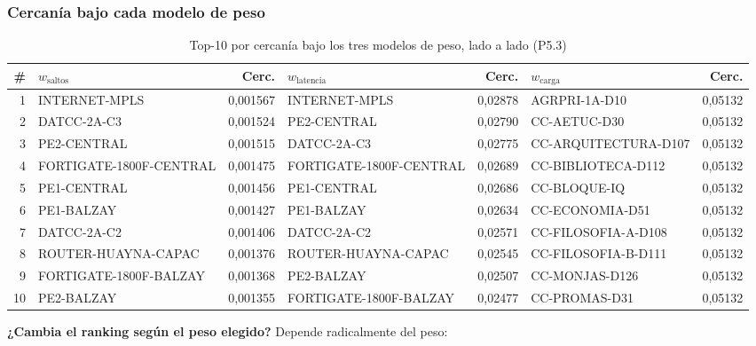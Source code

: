 \documentclass[10pt,a4paper]{extarticle}
\begin{document}
\subsubsection{Cercanía bajo cada modelo de peso}

\begin{table}[H]
\centering
\caption{Top-10 por cercanía bajo los tres modelos de peso, lado a lado (P5.3)}
\label{tab:cercania}
\scriptsize
\setlength{\tabcolsep}{2.8pt}
\begin{adjustbox}{max width=\textwidth}
\begin{tabular}{r|lr|lr|lr}
\toprule
\# & \textbf{$w_{\text{saltos}}$} & Cerc. & \textbf{$w_{\text{latencia}}$} & Cerc. & \textbf{$w_{\text{carga}}$} & Cerc. \\
\midrule
1  & INTERNET-MPLS            & 0,001567 & INTERNET-MPLS            & 0,02878 & AGRPRI-1A-D10        & 0,05132 \\
2  & DATCC-2A-C3              & 0,001524 & PE2-CENTRAL              & 0,02790 & CC-AETUC-D30         & 0,05132 \\
3  & PE2-CENTRAL              & 0,001515 & DATCC-2A-C3              & 0,02775 & CC-ARQUITECTURA-D107 & 0,05132 \\
4  & FORTIGATE-1800F-CENTRAL  & 0,001475 & FORTIGATE-1800F-CENTRAL  & 0,02689 & CC-BIBLIOTECA-D112   & 0,05132 \\
5  & PE1-CENTRAL              & 0,001456 & PE1-CENTRAL              & 0,02686 & CC-BLOQUE-IQ         & 0,05132 \\
6  & PE1-BALZAY               & 0,001427 & PE1-BALZAY               & 0,02634 & CC-ECONOMIA-D51      & 0,05132 \\
7  & DATCC-2A-C2              & 0,001406 & DATCC-2A-C2              & 0,02571 & CC-FILOSOFIA-A-D108  & 0,05132 \\
8  & ROUTER-HUAYNA-CAPAC      & 0,001376 & ROUTER-HUAYNA-CAPAC      & 0,02545 & CC-FILOSOFIA-B-D111  & 0,05132 \\
9  & FORTIGATE-1800F-BALZAY   & 0,001368 & PE2-BALZAY               & 0,02507 & CC-MONJAS-D126       & 0,05132 \\
10 & PE2-BALZAY               & 0,001355 & FORTIGATE-1800F-BALZAY   & 0,02477 & CC-PROMAS-D31        & 0,05132 \\
\bottomrule
\end{tabular}
\end{adjustbox}
\end{table}

\textbf{¿Cambia el ranking según el peso elegido?} Depende radicalmente del peso:
\end{document}
